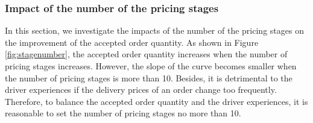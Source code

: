 \documentclass[sigconf,authordraft]{acmart}
\begin{document}
    

\subsubsection{Impact of the number of the pricing stages}

In this section, we investigate the impacts of the number of the pricing stages on the improvement of the accepted order quantity. As shown in Figure \ref{fig:stagenumber}, the accepted order quantity increases when the number of pricing stages increases. However, the slope of the curve becomes smaller when the number of pricing stages is more than 10. Besides, it is detrimental to the driver experiences if the delivery prices of an order change too frequently. Therefore, to balance the accepted order quantity and the driver experiences, it is reasonable to set the number of pricing stages no more than 10.
\end{document}
